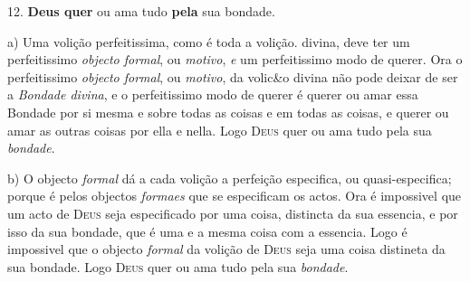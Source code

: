  12. \textbf{Deus quer} ou ama tudo \textbf{pela} sua bondade.

a) Uma volição perfeitissima, como é toda a volição. divina, deve ter um perfeitissimo \emph{objecto formal}, ou \emph{motivo}, \emph{e} um perfeitissimo modo de querer. Ora o perfeitissimo \emph{objecto formal}, ou \emph{motivo}, da volic\&o divina não pode deixar de ser a \emph{Bondade divina}, e o perfeitissimo modo de querer é querer ou amar essa Bondade por si mesma e sobre todas as coisas e em todas as coisas, e querer ou amar as outras coisas por ella e nella. Logo \textsc{Deus} quer ou ama tudo pela sua \emph{bondade}.

b) O objecto \emph{formal} dá a cada volição a perfeição especifica, ou quasi-especifica; porque é pelos objectos \emph{formaes} que se especificam os actos. Ora é impossivel que um acto de \textsc{Deus} seja especificado por uma coisa, distincta da sua essencia, e por isso da sua bondade, que é uma e a mesma coisa com a essencia. Logo é impossivel que o objecto \emph{formal} da volição de \textsc{Deus} seja uma coisa distineta da sua bondade. Logo \textsc{Deus} quer ou ama tudo pela sua \emph{bondade}.

